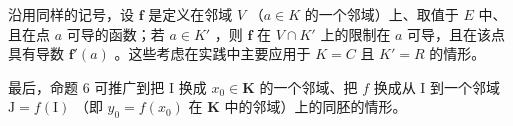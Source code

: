 沿用同样的记号，设 \(\mathbf{f}\) 是定义在邻域 \(V\) （\(a \in K\) 的一个邻域）上、取值于 \(E\) 中、且在点 \(a\) 可导的函数；若 \(a \in K'\) ，则 \(\mathbf{f}\) 在 \(V \cap K'\) 上的限制在 \(a\) 可导，且在该点具有导数 \(\mathbf{f}'(a)\) 。这些考虑在实践中主要应用于 \(K = C\) 且 \(K' = R\) 的情形。

最后，命题 6 可推广到把 I 换成 \(x_0 \in \mathbf{K}\) 的一个邻域、把 \(f\) 换成从 I 到一个邻域 \(\mathrm{J} = f(\mathrm{I})\) （即 \(y_0 = f(x_0)\) 在 \(\mathbf{K}\) 中的邻域）上的同胚的情形。

